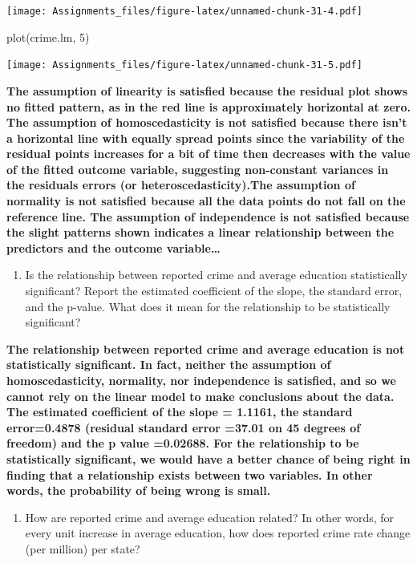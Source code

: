 \documentclass[
]{article}
\newenvironment{Shaded}{\begin{snugshade}}{\end{snugshade}}
\newcommand{\DecValTok}[1]{\textcolor[rgb]{0.00,0.00,0.81}{#1}}
\newcommand{\FunctionTok}[1]{\textcolor[rgb]{0.00,0.00,0.00}{#1}}
\newcommand{\NormalTok}[1]{#1}
\providecommand{\tightlist}{%
  \setlength{\itemsep}{0pt}\setlength{\parskip}{0pt}}
\begin{document}
\texttt{[image: Assignments\_files/figure-latex/unnamed-chunk-31-4.pdf]}

\begin{Shaded}
\begin{Highlighting}[]
\FunctionTok{plot}\NormalTok{(crime.lm, }\DecValTok{5}\NormalTok{)}
\end{Highlighting}
\end{Shaded}

\texttt{[image: Assignments\_files/figure-latex/unnamed-chunk-31-5.pdf]}

\textbf{The assumption of linearity is satisfied because the residual
plot shows no fitted pattern, as in the red line is approximately
horizontal at zero. The assumption of homoscedasticity is not satisfied
because there isn't a horizontal line with equally spread points since
the variability of the residual points increases for a bit of time then
decreases with the value of the fitted outcome variable, suggesting
non-constant variances in the residuals errors (or
heteroscedasticity).The assumption of normality is not satisfied because
all the data points do not fall on the reference line. The assumption of
independence is not satisfied because the slight patterns shown
indicates a linear relationship between the predictors and the outcome
variable\ldots{}}

\begin{enumerate}
\def\labelenumi{\arabic{enumi}.}
\setcounter{enumi}{4}
\tightlist
\item
  Is the relationship between reported crime and average education
  statistically significant? Report the estimated coefficient of the
  slope, the standard error, and the p-value. What does it mean for the
  relationship to be statistically significant?
\end{enumerate}

\textbf{The relationship between reported crime and average education is
not statistically significant. In fact, neither the assumption of
homoscedasticity, normality, nor independence is satisfied, and so we
cannot rely on the linear model to make conclusions about the data. The
estimated coefficient of the slope = 1.1161, the standard error=0.4878
(residual standard error =37.01 on 45 degrees of freedom) and the p
value =0.02688. For the relationship to be statistically significant, we
would have a better chance of being right in finding that a relationship
exists between two variables. In other words, the probability of being
wrong is small.}

\begin{enumerate}
\def\labelenumi{\arabic{enumi}.}
\setcounter{enumi}{5}
\tightlist
\item
  How are reported crime and average education related? In other words,
  for every unit increase in average education, how does reported crime
  rate change (per million) per state?
\end{enumerate}
\end{document}
